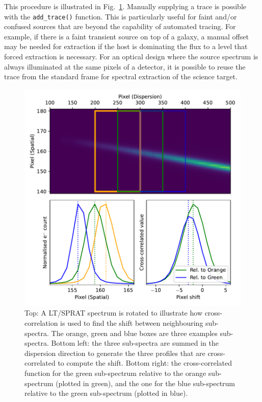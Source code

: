 \documentclass[linenumbers, twocolumn]{aastex631}
\begin{document}
This procedure is illustrated in Fig.~\ref{fig:trace}. Manually
supplying a trace is possible with the \texttt{add\_trace()}
function. This is particularly useful for faint and/or confused
sources that are beyond the capability of automated tracing. For
example, if there is a faint transient source on top of a galaxy,
a manual offset may be needed for extraction if the host is
dominating the flux to a level that forced extraction is necessary.
For an optical design where the source spectrum is always illuminated
at the same pixels of a detector, it is possible to reuse the trace
from the standard frame for spectral extraction of the science target.

\begin{figure}
    \centering
    \includegraphics[width=\columnwidth]{fig_01_tracing.pdf}
    \caption{Top: A LT/SPRAT spectrum is rotated to illustrate how
    cross-correlation is used to find the shift between neighbouring
    sub-spectra. The orange, green and blue boxes are three examples
    sub-spectra. Bottom left: the three sub-spectra are summed in
    the dispersion direction to generate the three profiles that are
    cross-correlated to compute the shift. Bottom right: the
    cross-correlated function for the green sub-spectrum relative
    to the orange sub-spectrum (plotted in green), and the one
    for the blue sub-spectrum relative to the green sub-spectrum
    (plotted in blue).}
    \label{fig:trace}
\end{figure}
\end{document}
